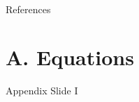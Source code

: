 \begin{frame}{References}
    \printbibliography[heading=none]
\end{frame}

\appendix

\bgroup
{}
\begin{frame}[plain]{}
\end{frame}
\egroup
\setcounter{framenumber}{0}


\section{A. Equations}
\begin{frame}{Appendix Slide I}
    
\end{frame}


